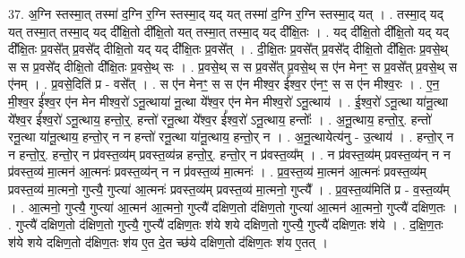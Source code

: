 \documentclass[17pt]{extarticle}
\begin{document}
37. अ॒ग्नि स्तस्मा॒त् तस्मा॑ द॒ग्नि र॒ग्नि स्तस्मा॒द् यद् यत् तस्मा॑ द॒ग्नि र॒ग्नि स्तस्मा॒द् यत् । . तस्मा॒द् यद् यत् तस्मा॒त् तस्मा॒द् यद् दी᳚क्षि॒तो दी᳚क्षि॒तो यत् तस्मा॒त् तस्मा॒द् यद् दी᳚क्षि॒तः । . यद् दी᳚क्षि॒तो दी᳚क्षि॒तो यद् यद् दी᳚क्षि॒तः प्र॒वसे᳚त् प्र॒वसे᳚द् दीक्षि॒तो यद् यद् दी᳚क्षि॒तः प्र॒वसे᳚त् । . दी॒क्षि॒तः प्र॒वसे᳚त् प्र॒वसे᳚द् दीक्षि॒तो दी᳚क्षि॒तः प्र॒वसे॒थ् स स प्र॒वसे᳚द् दीक्षि॒तो दी᳚क्षि॒तः प्र॒वसे॒थ् सः । . प्र॒वसे॒थ् स स प्र॒वसे᳚त् प्र॒वसे॒थ् स ए॑न मेनꣳ॒॒ स प्र॒वसे᳚त् प्र॒वसे॒थ् स ए॑नम् । . प्र॒वसे॒दिति॑ प्र - वसे᳚त् । . स ए॑न मेनꣳ॒॒ स स ए॑न मीश्व॒र ई᳚श्व॒र ए॑नꣳ॒॒ स स ए॑न मीश्व॒रः । . ए॒न॒ मी॒श्व॒र ई᳚श्व॒र ए॑न मेन मीश्व॒रो॑ ऽनू॒त्थाया॑ नू॒त्था ये᳚श्व॒र ए॑न मेन मीश्व॒रो॑ ऽनू॒त्थाय॑ । . ई॒श्व॒रो॑ ऽनू॒त्था या॑नू॒त्था ये᳚श्व॒र ई᳚श्व॒रो॑ ऽनू॒त्थाय॒ हन्तो॒र्॒. हन्तो॑ रनू॒त्था ये᳚श्व॒र ई᳚श्व॒रो॑ ऽनू॒त्थाय॒ हन्तोः᳚ । . अ॒नू॒त्थाय॒ हन्तो॒र्॒. हन्तो॑ रनू॒त्था या॑नू॒त्थाय॒ हन्तो॒र् न न हन्तो॑ रनू॒त्था या॑नू॒त्थाय॒ हन्तो॒र् न । . अ॒नू॒त्थायेत्य॑नु - उ॒त्थाय॑ । . हन्तो॒र् न न हन्तो॒र्॒. हन्तो॒र् न प्र॑वस्त॒व्य॑म् प्रवस्त॒व्य॑न्न हन्तो॒र्॒. हन्तो॒र् न प्र॑वस्त॒व्य᳚म् । . न प्र॑वस्त॒व्य॑म् प्रवस्त॒व्य॑न् न न प्र॑वस्त॒व्य॑ मा॒त्मन॑ आ॒त्मनः॑ प्रवस्त॒व्य॑न् न न प्र॑वस्त॒व्य॑ मा॒त्मनः॑ । . प्र॒व॒स्त॒व्य॑ मा॒त्मन॑ आ॒त्मनः॑ प्रवस्त॒व्य॑म् प्रवस्त॒व्य॑ मा॒त्मनो॒ गुप्त्यै॒ गुप्त्या॑ आ॒त्मनः॑ प्रवस्त॒व्य॑म् प्रवस्त॒व्य॑ मा॒त्मनो॒ गुप्त्यै᳚ । . प्र॒व॒स्त॒व्य॑मिति॑ प्र - व॒स्त॒व्य᳚म् । . आ॒त्मनो॒ गुप्त्यै॒ गुप्त्या॑ आ॒त्मन॑ आ॒त्मनो॒ गुप्त्यै॑ दक्षिण॒तो द॑क्षिण॒तो गुप्त्या॑ आ॒त्मन॑ आ॒त्मनो॒ गुप्त्यै॑ दक्षिण॒तः । . गुप्त्यै॑ दक्षिण॒तो द॑क्षिण॒तो गुप्त्यै॒ गुप्त्यै॑ दक्षिण॒तः श॑ये शये दक्षिण॒तो गुप्त्यै॒ गुप्त्यै॑ दक्षिण॒तः श॑ये । . द॒क्षि॒ण॒तः श॑ये शये दक्षिण॒तो द॑क्षिण॒तः श॑य ए॒त दे॒त च्छ॑ये दक्षिण॒तो द॑क्षिण॒तः श॑य ए॒तत् । \newline
\end{document}
